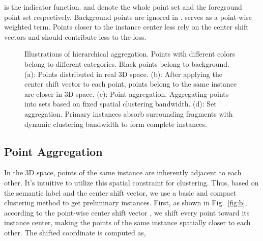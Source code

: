 \documentclass[10pt,twocolumn,letterpaper]{article}
\begin{document}
 is the indicator function. 
 and  denote the whole point set and the foreground point set respectively. Background points are ignored in .
 serves as a point-wise weighted term.
Points closer to the instance center less rely on the center shift vectors and 
should contribute less to the loss.
\begin{figure*}[thbp]
    \centering
    
    \caption{Illustrations of hierarchical aggregation. Points with different colors belong to different categories. Black points belong to background. (a): Points distributed in real 3D space. (b): After applying the center shift vector to each point, points belong to the same instance are closer in 3D space. (c): Point aggregation. Aggregating  points into sets based on fixed spatial clustering bandwidth. (d): Set aggregation. Primary instances absorb surrounding fragments with dynamic clustering bandwidth to form complete instances. }
\end{figure*}

\subsection{Point Aggregation}
\label{sec:point-aggr}
In the 3D space, points of the same instance are inherently adjacent to each other. It's intuitive to utilize this spatial constraint for clustering.
Thus, based on the semantic label and the center shift vector, we use a basic and compact clustering method to get preliminary instances. First, as shown in Fig.~\ref{fig:b}, according to the point-wise center shift vector , we shift every point  toward its instance center, making the points of the same instance spatially closer to each other. The shifted coordinate is computed as,
\end{document}
